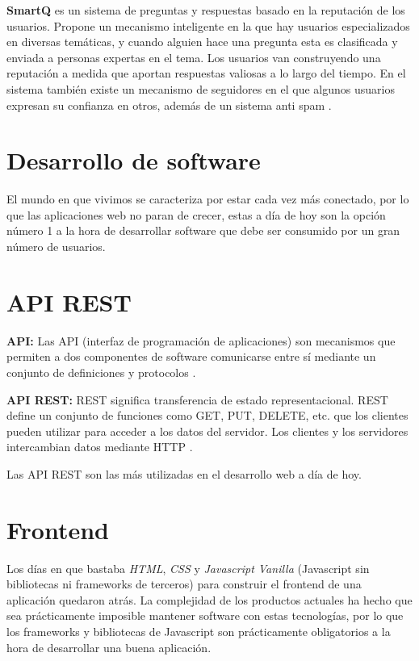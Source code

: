 \textbf{SmartQ} es un sistema de preguntas y respuestas basado en la reputación de los usuarios. Propone un mecanismo inteligente en la que hay usuarios especializados en diversas temáticas, y cuando alguien hace una pregunta esta es clasificada y enviada a personas expertas en el tema. Los usuarios van construyendo una reputación a medida que aportan respuestas valiosas a lo largo del tiempo. En el sistema también existe un mecanismo de seguidores en el que algunos usuarios expresan su confianza en otros, además de un sistema anti spam \cite{smartq}.

\section{Desarrollo de software} 

El mundo en que vivimos se caracteriza por estar cada vez más conectado, por lo que las aplicaciones web no paran de crecer, estas a día de hoy son la opción número 1 a la hora de desarrollar software que debe ser consumido por un gran número de usuarios.

\section{API REST}
\textbf{API:} Las API (interfaz de programación de aplicaciones) son mecanismos que permiten a dos componentes de software comunicarse entre sí mediante un conjunto de definiciones y protocolos \cite{apirest}.
\newline

\textbf{API REST:} REST significa transferencia de estado representacional. REST define un conjunto de funciones como GET, PUT, DELETE, etc. que los clientes pueden utilizar para acceder a los datos del servidor. Los clientes y los servidores intercambian datos mediante HTTP \cite{apirest}.
\newline

Las API REST son las más utilizadas en el desarrollo web a día de hoy.

\section{Frontend}
Los días en que bastaba \textit{HTML}, \textit{CSS} y \textit{Javascript Vanilla} (Javascript sin bibliotecas ni frameworks de terceros) para construir el frontend de una aplicación quedaron atrás. La complejidad de los productos actuales ha hecho que sea prácticamente imposible mantener software con estas tecnologías, por lo que los frameworks y bibliotecas de Javascript son prácticamente obligatorios a la hora de desarrollar una buena aplicación.
\newline

